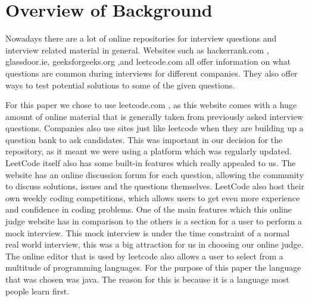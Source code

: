 \documentclass{article}
\begin{document}
\section{Overview of Background}
\par Nowadays there are a lot of online repositories for interview questions and interview related material in general. Websites such as hackerrank.com , glassdoor.ie, geeksforgeeks.org ,and leetcode.com all offer information on what questions are common during interviews for different companies. They also offer ways to test potential solutions to some of the given questions. 
\par For this paper we chose to use leetcode.com \cite{leet1}, as this website comes with a huge amount of online material that is generally taken from previously asked interview questions. Companies also use sites just like leetcode when they are building up a question bank to ask candidates. This was important in our decision for the repository, as it meant we were using a platform which was regularly updated. LeetCode itself also has some built-in features which really appealed to us. The website has an online discussion forum for each question, allowing the community to discuss solutions, issues and the questions themselves. LeetCode also host their own weekly coding competitions, which allows users to get even more experience and confidence in coding problems. One of the main features which this online judge website has in comparison to the others is a section for a user to perform a mock interview. This mock interview is under the time constraint of a normal real world interview, this was a big attraction for us in choosing our online judge. The online editor that is used by leetcode also allows a user to select from a multitude of programming languages. For the purpose of this paper the language that was chosen was java. The reason for this is because it is a language most people learn first.
\end{document}
